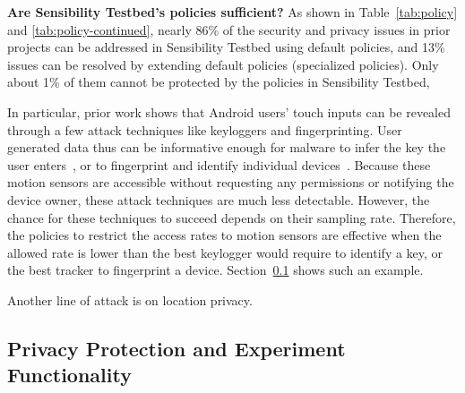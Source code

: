 \textbf{Are Sensibility Testbed's policies sufficient?}
As shown in Table~\ref{tab:policy} and \ref{tab:policy-continued}, nearly 86\% 
of the security and privacy issues in prior projects can be addressed in 
Sensibility Testbed using default policies, and 13\% issues can be resolved by extending 
default policies (specialized policies). Only about 1\% of them cannot
be protected by the policies in Sensibility Testbed, 

In particular, prior work shows 
that Android users' touch inputs can be revealed through a few attack 
techniques like keyloggers and fingerprinting. 
User generated data thus can be informative enough 
for malware to infer the key the user enters~\cite{cai2011touchlogger, 
owusu2012accessory}, or to fingerprint and identify individual 
devices~\cite{bojinov2014mobile, dey2014accelprint}. Because these 
motion sensors are accessible 
without requesting any 
permissions or notifying the device owner, these attack techniques are much 
less detectable. However, the chance for these techniques to succeed
depends on their sampling rate. 
Therefore, the policies to restrict the access rates to motion sensors 
are effective when the allowed rate is lower than the best keylogger 
would require to identify a key, or the best tracker to fingerprint a device.
Section~\ref{sec-experiment} shows such an example. 

Another line of attack is on location privacy. 


\subsection{Privacy Protection and Experiment Functionality}\label{sec-experiment}

